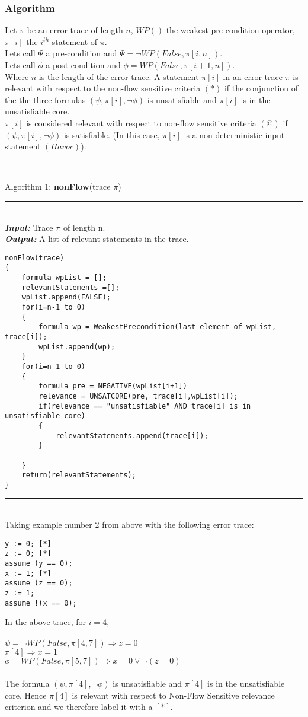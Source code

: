 \documentclass{article}
\begin{document}
\subsubsection{Algorithm}
Let $\pi$ be an error trace of length $n$, $WP()$ the weakest pre-condition operator, $\pi[i]$ the $i^{th}$ statement of $\pi$.\\
Lets call $\Psi$ a pre-condition and $\Psi = \neg WP(False, \pi[i,n])$.\\
Lets call $\phi$ a post-condition and $\phi =  WP(False, \pi[i+1,n])$.\\
 Where $n$ is the length of the error trace.
A statement $\pi[i]$ in an error trace $\pi$ is relevant with respect to the non-flow sensitive criteria $(*)$ if the conjunction of the the three formulas $(\psi,\pi[i],\neg \phi) $ is unsatisfiable and $\pi[i]$ is in the unsatisfiable core.\\
$\pi[i]$ is considered relevant with respect to non-flow sensitive criteria $(@)$ if  $(\psi,\pi[i],\neg \phi) $ is satisfiable. (In this case, $\pi[i]$ is a non-deterministic input statement $(Havoc)$).\\
\rule{\textwidth}{1pt}\\
Algorithm 1: \textbf{nonFlow}(trace $\pi$)\\
\noindent\rule{12cm}{0.4pt}\\
\textbf{\textit{Input:}} Trace $\pi$ of length n.\\
\textbf{\textit{Output:}} A list of relevant statements in the trace.
\begin{lstlisting}
nonFlow(trace)
{
	formula wpList = [];
	relevantStatements =[];
	wpList.append(FALSE);
	for(i=n-1 to 0)
	{
		formula wp = WeakestPrecondition(last element of wpList, trace[i]);
		wpList.append(wp);
	}
	for(i=n-1 to 0)
	{
		formula pre = NEGATIVE(wpList[i+1])
		relevance = UNSATCORE(pre, trace[i],wpList[i]);
		if(relevance == "unsatisfiable" AND trace[i] is in unsatisfiable core)
		{
			relevantStatements.append(trace[i]);
		}
		
	}
	return(relevantStatements);
}
\end{lstlisting}
\rule{\textwidth}{1pt}\\
Taking example number 2 from above with the following error trace:

\begin{lstlisting}
y := 0; [*]
z := 0; [*]
assume (y == 0);
x := 1; [*]
assume (z == 0);
z := 1;
assume !(x == 0);
\end{lstlisting}
In the above trace, for $i=4$,\\
\\
$\psi = \neg WP(False, \pi[4,7]) \Longrightarrow z=0$\\
$\pi[4] \Longrightarrow x=1$\\
$\phi =  WP(False, \pi[5,7]) \Longrightarrow x=0 \vee \neg(z=0)$\\
\\
The formula $(\psi,\pi[4],\neg \phi)$ is unsatisfiable and $\pi[4]$ is in the unsatisfiable core. Hence $\pi[4]$ is relevant with respect to Non-Flow Sensitive relevance criterion and we therefore label it with a $[*]$.
\end{document}
